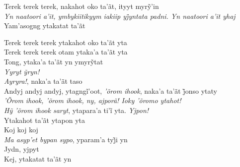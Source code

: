 \bigskip

\begin{linenumbers}\begingroup\raggedright

\noindent   Terek terek terek, nakahot oko ta’ãt, ityyt myrỹ’in\\
  \emph{Yn naatoori a’it, ymbykiitikyym iakiip yj̃yntata padni. Yn naatoori a’it yhaj}\\
  Yam'asogng ytakatat ta'ãt

\end{linenumbers}\endgroup

\bigskip

\begin{linenumbers}\begingroup\raggedright

\noindent   Terek terek terek ytakahot oko ta'ãt yta\\
  Terek terek terek otam ytaka'a ta'ãt yta\\
  Tong, ytaka’a ta’ãt yn ymyrỹtat\\
  \emph{Yyryt ỹryn!}\\
  \emph{Ayryra!}, naka'a ta'ãt taso\\
  Andyj andyj andyj, ytagngĩ’oot, \emph{’õrom ihook}, naka’a ta’ãt j̃onso ytaty\\
  \emph{'Õrom ihook, 'õrom ihook, ny, ajporã! Ioky 'õromo ytahot!}\\
  \emph{Hỹ ’õrom ihook saryt}, ytapara’a ti’ĩ yta. \emph{Yjpon!}\\
  Ytakahot ta'ãt ytapon yta\\
  Koj koj koj\\
  \emph{Ma asyp’et bypan sypo}, yparam’a tyj̃i yn\\
  Jydn, yjpyt\\
  Kej, ytakatat ta'ãt yn

\end{linenumbers}\endgroup

